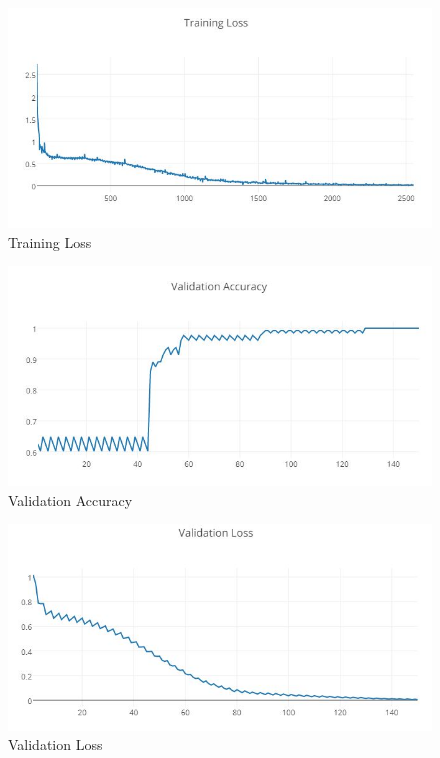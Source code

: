         \begin{figure}[htbp]
	    \centering
		\includegraphics[scale=0.5]{Figures/trainingLoss(him).JPG}
	    \caption[Training Loss]{Training Loss}
	    \label{fig:trainloss}
        \end{figure}
        
        
        
        \begin{figure}[htbp]
	    \centering
		\includegraphics[scale=0.5]{Figures/validationAccuracy(him).JPG}
	    \caption[Validation Accuracy]{Validation Accuracy}
	    \label{fig:valacc}
        \end{figure}
        
        \begin{figure}[htbp]
	    \centering
		\includegraphics[scale=0.5]{Figures/validationLoss(him).JPG}
	    \caption[Validation Loss]{Validation Loss}
	    \label{fig:valloss}
        \end{figure}
        
